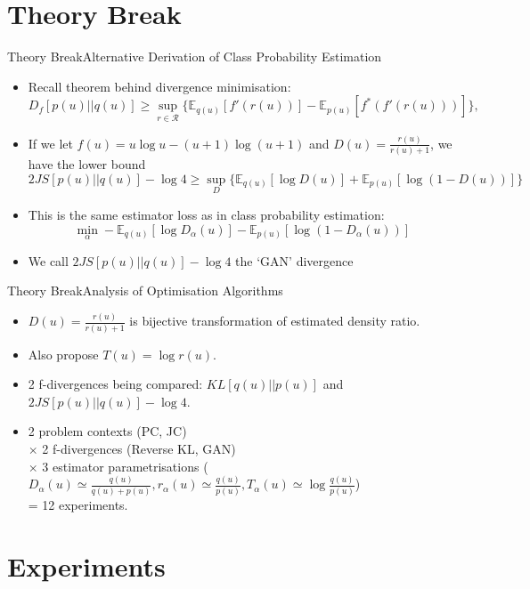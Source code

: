 \documentclass{beamer}
\newcommand{\E}{\mathbb{E}}
\begin{document}
\section{Theory Break}
\begin{frame}{Theory Break}{Alternative Derivation of Class Probability Estimation}
\begin{itemize}
\item Recall theorem behind divergence minimisation:
\[D_f [p(u)||q(u)]\geq \sup_{r\in \mathcal{R}} \{\mathbb{E}_{q(u)}[f'(r(u))]-\mathbb{E}_{p(u)}[f^*(f'(r(u)))]\},\]
\item If we let $f(u)=u\log u-(u+1)\log (u+1)$ and $D(u)=\frac{r(u)}{r(u)+1}$, we have the lower bound
\[2JS[p(u)||q(u)]-\log 4\geq \sup_{D}\{\E_{q(u)}[\log D(u)]+\E_{p(u)}[\log(1-D(u))]\}\]
\item This is the same estimator loss as in class probability estimation:
\[\min_\alpha -\mathbb{E}_{q(u)}[\log D_\alpha(u)]-\mathbb{E}_{p(u)}[\log(1-D_\alpha(u))]\]
\item We call $2JS[p(u)||q(u)]-\log 4$ the `GAN' divergence
\end{itemize}
\end{frame}
\begin{frame}{Theory Break}{Analysis of Optimisation Algorithms}
\begin{itemize}
\item $D(u)=\frac{r(u)}{r(u)+1}$ is bijective transformation of estimated density ratio.
\item Also propose  $T(u)=\log r(u)$.
\item 2 f-divergences being compared: $KL[q(u)||p(u)]$ and $2JS[p(u)||q(u)]-\log 4$.
\item 2 problem contexts (PC, JC) \\
$\times$ 2 f-divergences (Reverse KL, GAN) \\
$\times$ 3 estimator parametrisations ($D_\alpha(u)\simeq\frac{q(u)}{q(u)+p(u)}, r_\alpha(u)
\simeq\frac{q(u)}{p(u)}, T_\alpha(u)\simeq\log \frac{q(u)}{p(u)}$)\\
 = 12 experiments.
\end{itemize}
\end{frame}
\section{Experiments}
\end{document}
